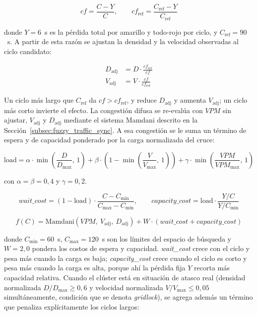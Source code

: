 \begin{equation}
cf = \frac{C - Y}{C}, \qquad
cf_{\text{ref}} = \frac{C_{\text{ref}} - Y}{C_{\text{ref}}}
\label{eq:cf_ratio}
\end{equation}

\noindent donde $Y = 6$~s es la pérdida total por amarillo y todo-rojo por ciclo, y
$C_{\text{ref}} = 90$~s. A partir de esta razón se ajustan la densidad y la velocidad
observadas al ciclo candidato:

\begin{align}
D_{\text{adj}} &= D \cdot \frac{cf_{\text{ref}}}{cf} \label{eq:density_adj} \\
V_{\text{adj}} &= V \cdot \frac{cf}{cf_{\text{ref}}} \label{eq:speed_adj}
\end{align}

\noindent Un ciclo más largo que $C_{\text{ref}}$ da $cf > cf_{\text{ref}}$, y reduce
$D_{\text{adj}}$ y aumenta $V_{\text{adj}}$; un ciclo más corto invierte el efecto. La
congestión difusa se re-evalúa con $VPM$ sin ajustar, $V_{\text{adj}}$ y $D_{\text{adj}}$
mediante el sistema Mamdani descrito en la Sección~\ref{subsec:fuzzy_traffic_sync}. A esa
congestión se le suma un término de espera y de capacidad ponderado por la carga normalizada
del cruce:

\begin{equation}
\text{load} = \alpha \cdot \min\!\left(\frac{D}{D_{\max}},\,1\right)
            + \beta \cdot \left(1 - \min\!\left(\frac{V}{V_{\max}},\,1\right)\right)
            + \gamma \cdot \min\!\left(\frac{VPM}{VPM_{\max}},\,1\right)
\label{eq:load}
\end{equation}

\noindent con $\alpha = \beta = 0{,}4$ y $\gamma = 0{,}2$.

\begin{equation}
\mathit{wait\_cost} = (1 - \text{load}) \cdot \frac{C - C_{\min}}{C_{\max} - C_{\min}}, \qquad
\mathit{capacity\_cost} = \text{load} \cdot \frac{Y / C}{Y / C_{\min}}
\label{eq:wait_capacity}
\end{equation}

\begin{equation}
f(C) = \text{Mamdani}(VPM,\ V_{\text{adj}},\ D_{\text{adj}})
     + W \cdot (\mathit{wait\_cost} + \mathit{capacity\_cost})
\label{eq:fitness}
\end{equation}

\noindent donde $C_{\min} = 60$~s, $C_{\max} = 120$~s son los límites del espacio de
búsqueda y $W = 2{,}0$ pondera los costos de espera y capacidad. \emph{wait\_cost} crece con
el ciclo y pesa más cuando la carga es baja; \emph{capacity\_cost} crece cuando el ciclo es
corto y pesa más cuando la carga es alta, porque ahí la pérdida fija $Y$ recorta más
capacidad relativa. Cuando el clúster está en situación
de atasco real (densidad normalizada $D/D_{\max} \geq 0{,}6$ y velocidad normalizada
$V/V_{\max} \leq 0{,}05$ simultáneamente, condición que se denota \emph{gridlock}), se agrega
además un término que penaliza explícitamente los ciclos largos:

